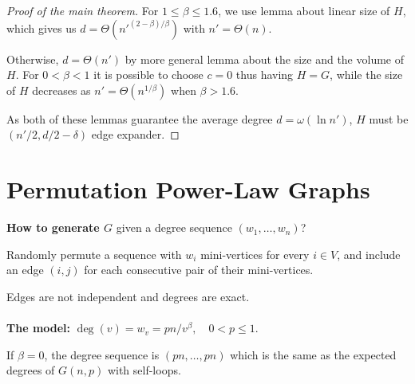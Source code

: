 \documentclass{beamer}
\newcommand{\autotitle}{\secname\ifdefempty{\subsecname}{}{~--- \subsecname}}
\newcommand{\clearsubsecname}{\long\def\subsecname{}}
\begin{document}
\begin{frame}{\autotitle}
    \begin{proof}[Proof of the main theorem]
        For $1\leq\beta\leq 1.6$, we use lemma about linear size of $H$,
        which gives us $d=\Theta\left(n'^{(2-\beta)/\beta}\right)$ with $n'=\Theta(n)$.

        Otherwise, $d=\Theta(n')$ by more general lemma
        about the size and the volume of $H$.
        For $0<\beta<1$ it is possible to choose $c=0$ thus having $H=G$,
        while the size of $H$ decreases as $n'=\Theta(n^{1/\beta})$ when $\beta>1.6$.
        
        As both of these lemmas guarantee the average degree $d=\omega(\ln n')$,
        $H$ must be $(n'/2,d/2-\delta)$ edge expander.
    \end{proof}
\end{frame}

\section{Permutation Power-Law Graphs}
\clearsubsecname

\begin{frame}{\autotitle}
    \textbf{How to generate $G$} given a degree sequence $(w_1,\ldots,w_n)$?
    
    Randomly permute a sequence with $w_i$ mini-vertices for every $i\in V$,
    and include an edge $(i,j)$ for each consecutive pair of their mini-vertices.
    
    Edges are not independent and degrees are exact.\\~\\
    
    \textbf{The model:} $\deg(v)=w_v=pn/v^\beta,\quad 0<p\leq 1$.
    
    If $\beta=0$, the degree sequence is $(pn,\ldots,pn)$ which is the same
    as the expected degrees of $G(n,p)$ with self-loops.
\end{frame}
\end{document}
